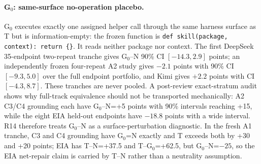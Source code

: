 \paragraph{G$_0$: same-surface no-operation placebo.}
G$_0$ executes exactly one assigned helper call through the same harness surface as T but is information-empty: the frozen function is \texttt{def skill(package, context): return \{\}}. It reads neither package nor context. The first DeepSeek 35-endpoint two-repeat tranche gives G$_0$--N 90\% CI $[-14.3,2.9]$ points; an independently frozen four-repeat A2 study gives $-2.1$ points with 90\% CI $[-9.3,5.0]$ over the full endpoint portfolio, and Kimi gives $+2.2$ points with CI $[-4.3,8.7]$. These tranches are never pooled. A post-review exact-stratum audit shows why full-track equivalence should not be transported mechanically: A2 C3/C4 grounding each have G$_0$--N=+5 points with 90\% intervals reaching +15, while the eight EIA held-out endpoints have $-18.8$ points with a wide interval. R14 therefore treats G$_0$--N as a surface-perturbation diagnostic. In the fresh A1 tranche, C3 and C4 grounding have G$_0$=N exactly and T exceeds both by +30 and +20 points; EIA has T--N=+37.5 and T--G$_0$=+62.5, but G$_0$--N=$-25$, so the EIA net-repair claim is carried by T--N rather than a neutrality assumption.

